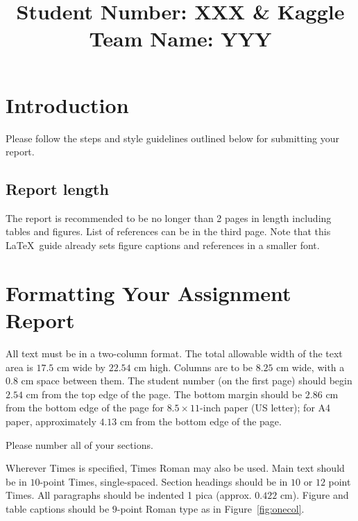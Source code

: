 \documentclass[10pt,twocolumn,letterpaper]{article}
\begin{document}
\title{Student Number: XXX \& Kaggle Team Name: YYY}  %

\maketitle
\thispagestyle{empty}


\section{Introduction}

Please follow the steps and style guidelines outlined below for submitting your report.


\subsection{Report length}
The report is recommended to be no longer than 2 pages in length including tables and figures. List of references can be in the third page. Note that this \LaTeX\ guide already sets figure captions and references in a smaller font.

\section{Formatting Your Assignment Report}

All text must be in a two-column format. The total allowable width of the text area is $17.5$ cm wide by $22.54$ cm high. Columns are to be $8.25$ cm wide, with a $0.8$ cm space between them. The student number (on the first page) should begin $2.54$ cm from the top edge of the page.  The bottom margin should be $2.86$ cm from the bottom edge of the page for $8.5 \times 11$-inch paper (US letter); for A4 paper, approximately $4.13$ cm from the bottom edge of the page.

Please number all of your sections.

Wherever Times is specified, Times Roman may also be used.  Main text should be in $10$-point Times, single-spaced. Section headings should be in $10$ or $12$ point Times.  All paragraphs should be indented 1 pica (approx. $0.422$ cm).  Figure and table captions should be $9$-point Roman type as in 
Figure~\ref{fig:onecol}.
\end{document}

